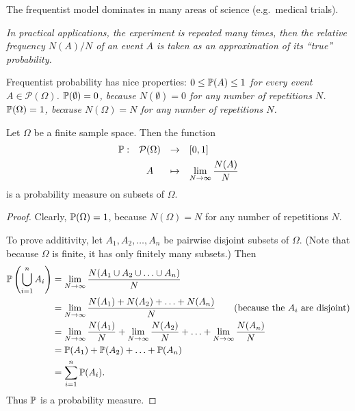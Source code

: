 The frequentist model dominates in many areas of science (e.g.\ medical trials). 

\bit
\it In practical applications, the experiment is repeated many times, then the relative frequency $N(A)/N$ of an event $A$ is taken as an approximation of its ``true'' probability.
\eit

Frequentist probability has nice properties:
\bit
\it $0\leq \mathbb{P}(A)\leq 1$ for every event $A\in\mathcal{P}(\Omega)$.
\it $\mathbb{P}(\emptyset)=0$, because $N(\emptyset)=0$ for any number of repetitions $N$.
\it $\mathbb{P}(\Omega)=1$, because $N(\Omega)=N$ for any number of repetitions $N$.
\eit

\begin{theorem}
Let $\Omega$ be a finite sample space. Then the function 
\[
\begin{array}{rccl}
\mathbb{P}:	& \mathcal{P}(\Omega)	& \to		& [0,1] \\[1ex]
	& A						& \mapsto	& \displaystyle\lim_{N\to\infty}\frac{N(A)}{N}
\end{array}
\]
is a probability measure on subsets of $\Omega$.
\end{theorem}
\begin{proof}
Clearly, $\mathbb{P}(\Omega)=1$, because $N(\Omega)=N$ for any number of repetitions $N$.
\par
To prove additivity, let $A_1,A_2,\ldots,A_n$ be pairwise disjoint subsets of $\Omega$. (Note that because $\Omega$ is finite, it has only finitely many subsets.) Then
\begin{align*}
\mathbb{P}\left(\bigcup_{i=1}^n A_i\right)
	& = \lim_{N\to\infty}\frac{N(A_1\cup  A_2\cup\ldots\cup A_n)}{N}  \\
	& = \lim_{N\to\infty}\frac{N(A_1) + N(A_2) + \ldots + N(A_n)}{N} \qquad\text{(because the $A_i$ are disjoint)}  \\
	& = \lim_{N\to\infty}\frac{N(A_1)}{N} + \lim_{N\to\infty}\frac{N(A_2)}{N} + \ldots + \lim_{N\to\infty}\frac{N(A_n)}{N} \\
	& = \mathbb{P}(A_1) + \mathbb{P}(A_2) + \ldots +\mathbb{P}(A_n) \\
	& = \sum_{i=1}^n \mathbb{P}(A_i).
\end{align*}
Thus $\mathbb{P}$ is a probability measure.
\end{proof}

